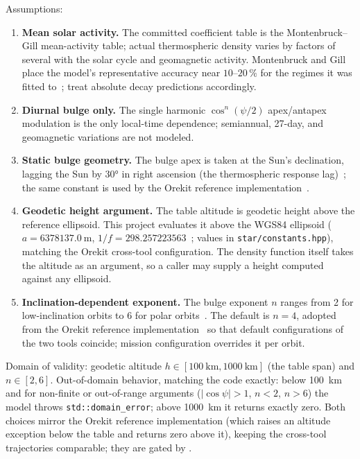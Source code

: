 Assumptions:
\begin{enumerate}
  \item \textbf{Mean solar activity.} The committed coefficient table is
    the Montenbruck--Gill mean-activity table; actual thermospheric
    density varies by factors of several with the solar cycle and
    geomagnetic activity. Montenbruck and Gill place the model's
    representative accuracy near $10$--$20\,\%$ for the regimes it was
    fitted to~\cite[Sect.~3.5.2]{montenbruck2000}; treat absolute decay
    predictions accordingly.
  \item \textbf{Diurnal bulge only.} The single harmonic
    $\cos^{n}(\psi/2)$ apex/antapex modulation is the only local-time
    dependence; semiannual, 27-day, and geomagnetic variations are not
    modeled.
  \item \textbf{Static bulge geometry.} The bulge apex is taken at the
    Sun's declination, lagging the Sun by \ang{30} in right ascension
    (the thermospheric response lag)~\cite[Sect.~3.5.2]{montenbruck2000};
    the same constant is used by the Orekit reference
    implementation~\cite{orekithp}.
  \item \textbf{Geodetic height argument.} The table altitude is geodetic
    height above the reference ellipsoid. This project evaluates it above
    the WGS84 ellipsoid ($a = \qty{6378137.0}{\metre}$,
    $1/f = 298.257223563$~\cite{nima2000}; values in
    \texttt{star/constants.hpp}), matching the Orekit cross-tool
    configuration. The density function itself takes the altitude as an
    argument, so a caller may supply a height computed against any
    ellipsoid.
  \item \textbf{Inclination-dependent exponent.} The bulge exponent $n$
    ranges from 2 for low-inclination orbits to 6 for polar
    orbits~\cite[Sect.~3.5.2]{montenbruck2000}. The default is $n = 4$,
    adopted from the Orekit reference implementation~\cite{orekithp} so
    that default configurations of the two tools coincide; mission
    configuration overrides it per orbit.
\end{enumerate}

Domain of validity: geodetic altitude
$h \in [\qty{100}{\kilo\metre}, \qty{1000}{\kilo\metre}]$ (the table
span) and $n \in [2, 6]$. Out-of-domain behavior, matching the code
exactly: below \qty{100}{\kilo\metre} and for non-finite or
out-of-range arguments ($|\cos\psi| > 1$, $n < 2$, $n > 6$) the model
throws \texttt{std::domain\_error}; above \qty{1000}{\kilo\metre} it
returns exactly zero. Both choices mirror the Orekit reference
implementation (which raises an altitude exception below the table and
returns zero above it), keeping the cross-tool trajectories comparable;
they are gated by .

